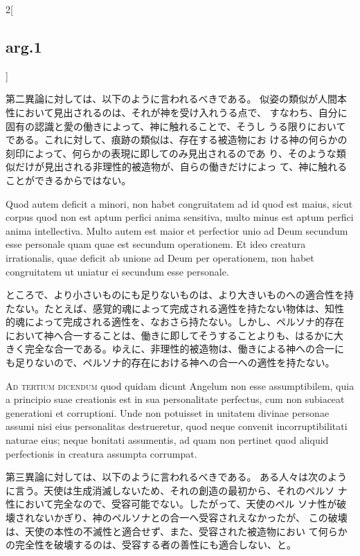 \documentclass[paper=a4paper,fontsize=10pt,jafontsize=9pt,titlepage]{jlreq}
\begin{document}
\begin{paracol}{2}[\subsection{arg.1}]
\switchcolumn

第二異論に対しては、以下のように言われるべきである。
似姿の類似が人間本性において見出されるのは、それが神を受け入れうる点で、
 すなわち、自分に固有の認識と愛の働きによって、神に触れることで、そうし
 うる限りにおいてである。これに対して、痕跡の類似は、存在する被造物にお
 ける神の何らかの刻印によって、何らかの表現に即してのみ見出されるのであ
 り、そのような類似だけが見出される非理性的被造物が、自らの働きだけによっ
 て、神に触れることができるからではない。

\switchcolumn*

Quod autem deficit a minori, non habet congruitatem ad id
quod est maius, sicut corpus quod non est aptum perfici anima sensitiva,
multo minus est aptum perfici anima intellectiva. Multo autem est maior
et perfectior unio ad Deum secundum esse personale quam quae est
secundum operationem. Et ideo creatura irrationalis, quae deficit ab
unione ad Deum per operationem, non habet congruitatem ut uniatur ei
secundum esse personale.

\switchcolumn

ところで、より小さいものにも足りないものは、より大きいものへの適合性を持
 たない。たとえば、感覚的魂によって完成される適性を持たない物体は、知性
 的魂によって完成される適性を、なおさら持たない。しかし、ペルソナ的存在
 において神へ合一することは、働きに即してそうすることよりも、はるかに大
 きく完全な合一である。ゆえに、非理性的被造物は、働きによる神への合一に
 も足りないので、ペルソナ的存在における神への合一への適性を持たない。

\switchcolumn*[\subsection{ad.3}]

{\scshape Ad tertium dicendum} quod quidam dicunt Angelum non esse assumptibilem,
quia a principio suae creationis est in sua personalitate perfectus, cum
non subiaceat generationi et corruptioni. Unde non potuisset in unitatem
divinae personae assumi nisi eius personalitas destrueretur, quod neque
convenit incorruptibilitati naturae eius; neque bonitati assumentis, ad
quam non pertinet quod aliquid perfectionis in creatura assumpta
corrumpat.

\switchcolumn

第三異論に対しては、以下のように言われるべきである。
ある人々は次のように言う。天使は生成消滅しないため、それの創造の最初から、それのペルソ
 ナ性において完全なので、受容可能でない。したがって、天使のペル
 ソナ性が破壊されないかぎり、神のペルソナとの合一へ受容されえなかったが、
 この破壊は、天使の本性の不滅性と適合せず、また、受容された被造物におい
 て何らかの完全性を破壊するのは、受容する者の善性にも適合しない、と。


\end{paracol}
\end{document}
